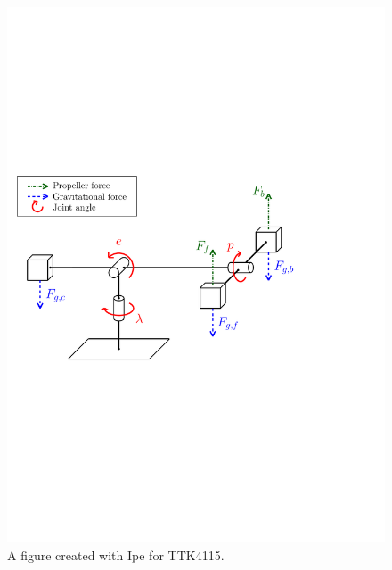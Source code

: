 \begin{figure}[tp]
	\centering
	\includegraphics[width=1.00\textwidth]{figures/forces.pdf}
	\caption{A figure created with Ipe for TTK4115.}
\label{fig:heli}
\end{figure}

